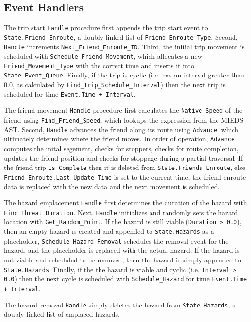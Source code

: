 \documentclass[12pt,letterpaper,titlepage]{article}
\newcommand{\code}[1]{\texttt{#1}}
\newcommand{\mieds}[0]{\textsc{MIEDS}}
\begin{document}
\subsection{Event Handlers}
The trip start \code{Handle} procedure first appends the trip start
event to \code{State.Friend_Enroute}, a doubly linked list of
\code{Friend_Enroute_Type}.  Second, \code{Handle} increments
\code{Next_Friend_Enroute_ID}.  Third, the initial trip movement is
scheduled with \code{Schedule_Friend_Movement}, which allocates a new
\code{Friend_Movement_Type} with the correct time and inserts it into
\code{State.Event_Queue}.  Finally, if the trip is cyclic (i.e. has an
interval greater than 0.0, as calculated by
\code{Find_Trip_Schedule_Interval}) then the next trip is scheduled
for time \code{Event.Time + Interval}.

The friend movement \code{Handle} procedure first calculates the
\code{Native_Speed} of the friend using \code{Find_Friend_Speed},
which lookups the expression from the \mieds{} AST.  Second,
\code{Handle} advances the friend along its route using
\code{Advance}, which ultimately determines where the friend moves.
In order of operation, \code{Advance} computes the inital segement,
checks for stoppers, checks for route completion, updates the friend
position and checks for stoppage during a partial traversal.  If the
friend trip \code{Is_Complete} then it is deleted from
\code{State.Friends_Enroute}, else
\code{Friend_Enroute.Last_Update_Time} is set to the current time, the
friend enroute data is replaced with the new data and the next
movement is scheduled.

The hazard emplacement \code{Handle} first determines the duration of
the hazard with \code{Find_Threat_Duration}.  Next, \code{Handle}
initializes and randomly sets the hazard location with
\code{Get_Random_Point}.  If the hazard is still viable
(\code{Duration > 0.0}), then an empty hazard is created and appended
to \code{State.Hazards} as a placeholder,
\code{Schedule_Hazard_Removal} schedules the removal event for the
hazard, and the placeholder is replaced with the actual hazard.  If
the hazard is not viable and scheduled to be removed, then the hazard
is simply appended to \code{State.Hazards}.  Finally, if the the
hazard is viable and cyclic (i.e. \code{Interval > 0.0}) then the next
cycle is scheduled with \code{Schedule_Hazard} for time
\code{Event.Time + Interval}.

The hazard removal \code{Handle} simply deletes the hazard from
\code{State.Hazards}, a doubly-linked list of emplaced hazards.
\end{document}
